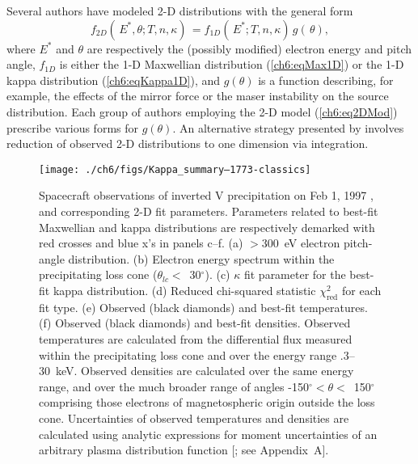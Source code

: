   Several authors \citep{Maggs1981,Bingham1999,Bingham2000,Mutel2007} have
  modeled 2-D distributions with the general form
    \begin{equation} \label{ch6:eq2DMod} f_{2D}(\, E^*, \theta ; T, n,
      \kappa) \, = f_{1D}(\, E^*; T, n, \kappa) \, g(\, \theta),
    \end{equation}
  where $E^*$ and $\theta$ are respectively the (possibly modified) electron
  energy and pitch angle, $f_{1D}$ is either the 1-D Maxwellian distribution
  (\ref{ch6:eqMax1D}) or the 1-D kappa distribution (\ref{ch6:eqKappa1D}), and
  $g(\theta )$ is a function describing, for example, the effects of the mirror
  force or the maser instability on the source distribution. Each group of
  authors employing the 2-D model (\ref{ch6:eq2DMod}) prescribe various forms
  for $g(\theta)$. An alternative strategy presented by \citet{Pritchett1999}
  involves reduction of observed 2-D distributions to one dimension via
  integration.


  \begin{figure}
    \centering
    \noindent\texttt{[image: ./ch6/figs/Kappa\_summary--1773-classics]}
    \caption[Inverted V precipitation and best-fit Maxwellian and kappa
    distribution parameters (Orbit 1773)]{Spacecraft observations of inverted V
      precipitation on Feb 1, 1997 \citep[Event previously reported
      by][]{Elphic1998}, and corresponding 2-D fit parameters. Parameters
      related to best-fit Maxwellian and kappa distributions are respectively
      demarked with red crosses and blue x's in panels c--f. (a) $>$300~eV
      electron pitch-angle distribution. (b) Electron energy spectrum within the
      precipitating loss cone ($\theta_{lc} <$~30$^\circ$). (c) $\kappa$ fit
      parameter for the best-fit kappa distribution. (d) Reduced chi-squared
      statistic $\chi^2_{\mathrm{red}}$ for each fit type. (e) Observed (black
      diamonds) and best-fit temperatures. (f) Observed (black diamonds) and
      best-fit densities. Observed temperatures are calculated from the
      differential flux measured within the precipitating loss cone and over the
      energy range .3--30~keV. Observed densities are calculated over the same
      energy range, and over the much broader range of angles -150$^\circ <
      \theta <$~150$^\circ$ comprising those electrons of magnetospheric origin
      outside the loss cone. Uncertainties of observed temperatures and
      densities are calculated using analytic expressions for moment
      uncertainties of an arbitrary plasma distribution function
      [\citealt{Gershman2015}; see Appendix~A].}
    \label{ch6:Fig1}
  \end{figure}

